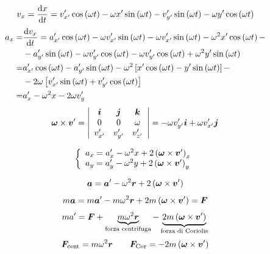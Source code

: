\begin{equation*}v_x=\frac{\mathrm{d} x}{\mathrm{d} t}=v'_{x'}\cos\left(\omega t\right)-\omega x'\sin\left(\omega t\right)-v'_{y'}\sin\left(\omega t\right)-\omega y'\cos\left(\omega t\right)\end{equation*}
\begin{align*}
a_x=&\frac{\mathrm{d} v_x}{\mathrm{d} t}=a'_{x'}\cos\left(\omega t\right)-\omega v'_{x'}\sin\left(\omega t\right)-\omega v'_{x'}\sin\left(\omega t\right)-\omega^2 x'\cos\left(\omega t\right)-\\
&-a'_{y'}\sin\left(\omega t\right)-\omega v'_{y'}\cos\left(\omega t\right)-\omega v'_{y'}\cos\left(\omega t\right)+\omega^2 y'\sin\left(\omega t\right)\\
=&a'_{x'}\cos\left(\omega t\right)-a'_{y'}\sin\left(\omega t\right)-\omega^2\left[x'\cos\left(\omega t\right)-y'\sin\left(\omega t\right)\right]-\\
&-2\omega\left[v'_{x'}\sin\left(\omega t\right)+v'_{y'}\cos\left(\omega t\right)\right]\\
=&a'_{x}-\omega^2 x-2\omega v'_{y}
\end{align*}
\[\boldsymbol{\omega}\times\boldsymbol{v}'=\left|\begin{array}{ccc}
\boldsymbol{i}&\boldsymbol{j}&\boldsymbol{k}\\
0&0&\omega\\
v'_{x'}&v'_{y'}&v'_{z'}\\
\end{array}
\right|
=-\omega v'_{y'}\boldsymbol{i}+\omega v'_{x'}\boldsymbol{j}\]

\[\left\{\begin{array}{l}
a_x=a'_x-\omega^2 x+2\left(\boldsymbol{\omega}\times\boldsymbol{v}'\right)_x\\
a_y=a'_y-\omega^2 y+2\left(\boldsymbol{\omega}\times\boldsymbol{v}'\right)_y\\
\end{array}\right.\]

\begin{equation*}\boldsymbol{a}=\boldsymbol{a}'-\omega^2 \boldsymbol{r}+2\left(\boldsymbol{\omega}\times\boldsymbol{v}'\right)\end{equation*}
\begin{equation*}m\boldsymbol{a}=m\boldsymbol{a}'-m\omega^2\boldsymbol{r}+2m\left(\boldsymbol{\omega}\times\boldsymbol{v}'\right)=\boldsymbol{F}\end{equation*}
\begin{equation*}ma'=\boldsymbol{F}+\underbrace{m\omega^2\boldsymbol{r}}_\text{forza centrifuga}-\underbrace{2m\left(\boldsymbol{\omega}\times\boldsymbol{v}'\right)}_\text{forza di Coriolis}\end{equation*}
\begin{equation*}\boldsymbol{F}_\text{cent}=m\omega^2 \boldsymbol{r}\qquad \boldsymbol{F}_\text{Cor}=-2m\left(\boldsymbol{\omega}\times\boldsymbol{v}'\right)\end{equation*}

